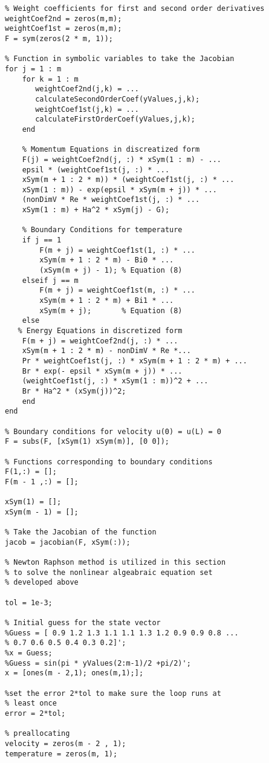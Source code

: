 \begin{lstlisting}
% Weight coefficients for first and second order derivatives
weightCoef2nd = zeros(m,m);
weightCoef1st = zeros(m,m);
F = sym(zeros(2 * m, 1));

% Function in symbolic variables to take the Jacobian
for j = 1 : m
    for k = 1 : m
       weightCoef2nd(j,k) = ...
       calculateSecondOrderCoef(yValues,j,k);
       weightCoef1st(j,k) = ...
       calculateFirstOrderCoef(yValues,j,k);
    end 
    
    % Momentum Equations in discreatized form
    F(j) = weightCoef2nd(j, :) * xSym(1 : m) - ...
    epsil * (weightCoef1st(j, :) * ...
    xSym(m + 1 : 2 * m)) * (weightCoef1st(j, :) * ...
    xSym(1 : m)) - exp(epsil * xSym(m + j)) * ...
    (nonDimV * Re * weightCoef1st(j, :) * ...
    xSym(1 : m) + Ha^2 * xSym(j) - G);
    
    % Boundary Conditions for temperature
    if j == 1
        F(m + j) = weightCoef1st(1, :) * ... 
        xSym(m + 1 : 2 * m) - Bi0 * ...
        (xSym(m + j) - 1); % Equation (8)
    elseif j == m
        F(m + j) = weightCoef1st(m, :) * ...
        xSym(m + 1 : 2 * m) + Bi1 * ...
        xSym(m + j);       % Equation (8)
    else 
   % Energy Equations in discretized form
    F(m + j) = weightCoef2nd(j, :) * ...
    xSym(m + 1 : 2 * m) - nonDimV * Re *...
    Pr * weightCoef1st(j, :) * xSym(m + 1 : 2 * m) + ...
    Br * exp(- epsil * xSym(m + j)) * ...
    (weightCoef1st(j, :) * xSym(1 : m))^2 + ...
    Br * Ha^2 * (xSym(j))^2;
    end
end

% Boundary conditions for velocity u(0) = u(L) = 0
F = subs(F, [xSym(1) xSym(m)], [0 0]);

% Functions corresponding to boundary conditions
F(1,:) = [];
F(m - 1 ,:) = [];

xSym(1) = [];
xSym(m - 1) = [];

% Take the Jacobian of the function
jacob = jacobian(F, xSym(:));

% Newton Raphson method is utilized in this section
% to solve the nonlinear algeabraic equation set 
% developed above

tol = 1e-3;

% Initial guess for the state vector
%Guess = [ 0.9 1.2 1.3 1.1 1.1 1.3 1.2 0.9 0.9 0.8 ...
% 0.7 0.6 0.5 0.4 0.3 0.2]';
%x = Guess;
%Guess = sin(pi * yValues(2:m-1)/2 +pi/2)';
x = [ones(m - 2,1); ones(m,1);];

%set the error 2*tol to make sure the loop runs at 
% least once 
error = 2*tol;

% preallocating
velocity = zeros(m - 2 , 1);
temperature = zeros(m, 1);


\end{lstlisting}
